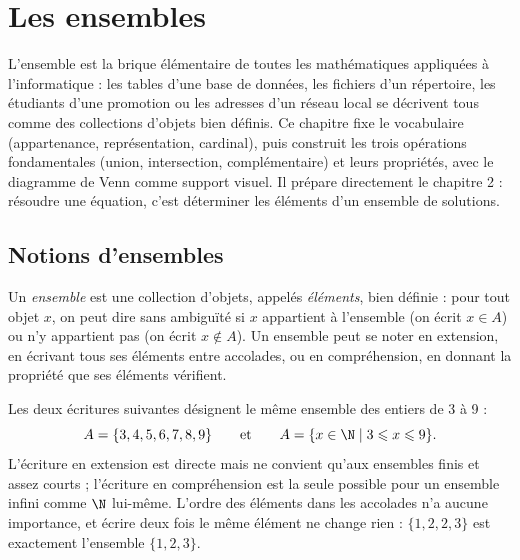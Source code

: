 \chapter{Les ensembles}

\begin{quelqueslignes}
L'ensemble est la brique élémentaire de toutes les mathématiques appliquées à l'informatique : les tables d'une base de données, les fichiers d'un répertoire, les étudiants d'une promotion ou les adresses d'un réseau local se décrivent tous comme des collections d'objets bien définis. Ce chapitre fixe le vocabulaire (appartenance, représentation, cardinal), puis construit les trois opérations fondamentales (union, intersection, complémentaire) et leurs propriétés, avec le diagramme de Venn comme support visuel. Il prépare directement le chapitre 2 : résoudre une équation, c'est déterminer les éléments d'un ensemble de solutions.
\end{quelqueslignes}

\section{Notions d'ensembles}

\begin{definition}
Un \emph{ensemble} est une collection d'objets, appelés \emph{éléments}, bien définie : pour tout objet $x$, on peut dire sans ambiguïté si $x$ appartient à l'ensemble (on écrit $x \in A$) ou n'y appartient pas (on écrit $x \notin A$). Un ensemble peut se noter en extension, en écrivant tous ses éléments entre accolades, ou en compréhension, en donnant la propriété que ses éléments vérifient.
\end{definition}

Les deux écritures suivantes désignent le même ensemble des entiers de 3 à 9 :
\[
A = \{3, 4, 5, 6, 7, 8, 9\} \qquad\text{et}\qquad A = \{x \in \N \mid 3 \leqslant x \leqslant 9\}.
\]
L'écriture en extension est directe mais ne convient qu'aux ensembles finis et assez courts ; l'écriture en compréhension est la seule possible pour un ensemble infini comme $\N$ lui-même. L'ordre des éléments dans les accolades n'a aucune importance, et écrire deux fois le même élément ne change rien : $\{1, 2, 2, 3\}$ est exactement l'ensemble $\{1, 2, 3\}$.

